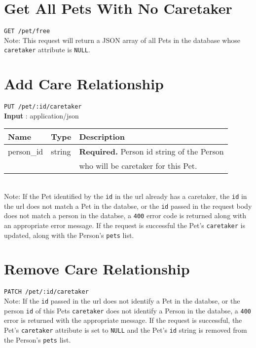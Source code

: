\documentclass{article}
\begin{document}
\section*{Get All Pets With No Caretaker}
\texttt{GET /pet/free} \\
Note: This request will return a JSON array of all Pets in the database whose
\texttt{caretaker} attribute is \texttt{NULL}.

\section*{Add Care Relationship}
\texttt{PUT /pet/:id/caretaker} \\
\textbf{Input} : application/json \\
\begin{tabular}{| l | l | l |}
	\hline
	\textbf{Name} & \textbf{Type} & \textbf{Description} \\
	\hline
	person\_id   & string         & \textbf{Required.} Person id string of the Person \\
		     &                & who will be caretaker for this Pet. \\
	\hline
\end{tabular} \\
Note: If the Pet identified by the \texttt{id} in the url already has a caretaker,
the \texttt{id} in the url does not match a Pet in the databse, or the \texttt{id}
passed in the request body does not match a person in the databse, a \texttt{400} error code
is returned along with an appropriate error message. If the request is successful the Pet's
\texttt{caretaker} is updated, along with the Person's \texttt{pets} list.

\section*{Remove Care Relationship}
\texttt{PATCH /pet/:id/caretaker} \\
Note: If the \texttt{id} passed in the url does not identify a Pet in the databse,
or the person \texttt{id} of this Pets \texttt{caretaker} does not identify a Person
in the databse, a \texttt{400} error is returned with the appropriate message.
If the request is successful, the Pet's \texttt{caretaker} attribute is set to
\texttt{NULL} and the Pet's \texttt{id} string is removed from the Person's
\texttt{pets} list.
\end{document}
